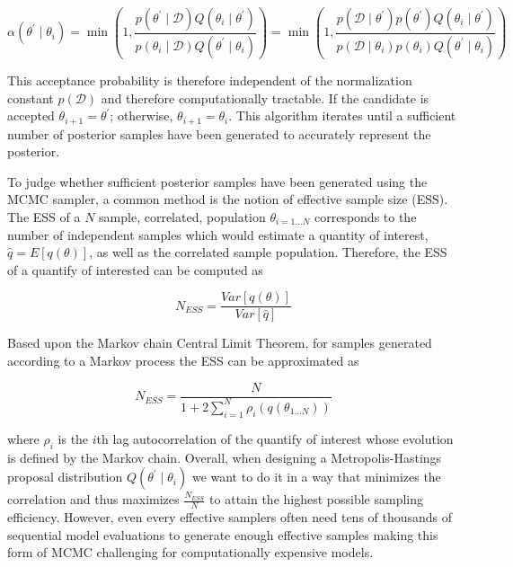 \documentclass[1p]{article}
\begin{document}
\begin{equation}
\alpha \left ( \theta^\prime \mid \theta_i \right ) = \min \left ( 1, \frac{p \left ( \theta^\prime \mid \mathcal{D} \right ) Q \left ( \theta_{i} \mid \theta^\prime \right ) }{p \left ( \theta_i \mid \mathcal{D} \right ) Q \left (\theta^\prime \mid  \theta_{i} \right ) } \right ) = \min \left ( 1, \frac{p \left (\mathcal{D} \mid \theta^\prime \right )p \left ( \theta^\prime \right ) Q \left ( \theta_{i} \mid \theta^\prime \right ) }{p \left (\mathcal{D} \mid \theta_i \right )p \left ( \theta_i \right ) Q \left (\theta^\prime \mid  \theta_{i} \right ) } \right )
\end{equation}

This acceptance probability is therefore independent of the normalization constant $p \left ( \mathcal{D} \right )$ and therefore computationally tractable. If the candidate is accepted $\theta_{i+1} = \theta^\prime$; otherwise, $\theta_{i+1} = \theta_i$. This algorithm iterates until a sufficient number of posterior samples have been generated to accurately represent the posterior.

 To judge whether sufficient posterior samples have been generated using the MCMC sampler, a common method is the notion of effective sample size (ESS). The ESS of a $N$ sample, correlated, population $\theta_{i=1...N}$ corresponds to the number of independent samples which would estimate a quantity of interest, $\hat{q} = E \left [ q \left (  \theta \right ) \right ]$, as well as the correlated sample population. Therefore, the ESS of a quantify of interested can be computed as

 \begin{equation}
 N_{ESS} = \frac{Var \left [q \left (  \theta \right )\right  ]}{Var \left [ \hat{q} \right  ]}
 \end{equation}

 Based upon the Markov chain Central Limit Theorem, for samples generated according to a Markov process the ESS can be approximated as

  \begin{equation}
 N_{ESS} = \frac{N}{1 + 2 \sum_{i=1}^N \rho_i \left ( q\left (\theta_{1 \dots N} \right ) \right )}
 \end{equation}

 where $\rho_i$ is the $i$th lag autocorrelation of the quantify of interest whose evolution is defined by the Markov chain. Overall, when designing a Metropolis-Hastings proposal distribution $Q \left (\theta^\prime \mid \theta_{i}\right )$ we want to do it in a way that minimizes the correlation and thus maximizes $\frac{N_{ESS} }{N}$ to attain the highest possible sampling efficiency. However, even every effective samplers often need tens of thousands of sequential model evaluations to generate enough effective samples making this form of MCMC challenging for computationally expensive models.
\end{document}
